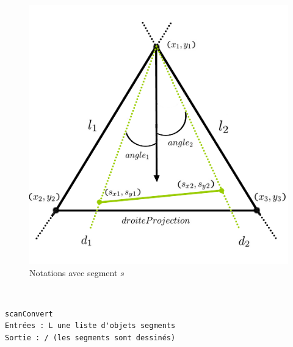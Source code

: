 \documentclass[11pt,a4paper]{article}
\theoremstyle{definition}
\theoremstyle{remark}
\begin{document}
\begin{figure}[!htbp]
\begin{minipage}[b]{0.4\textwidth}
    \includegraphics[width=\textwidth]{painter_notations_2.png}
    \caption{Notations avec segment $s$}
		\label{painter_notations_2}
  \end{minipage}
\end{figure}
\\

\begin{lstlisting}
scanConvert
Entrées : L une liste d'objets segments
Sortie : / (les segments sont dessinés)
\end{lstlisting}

\end{document}
